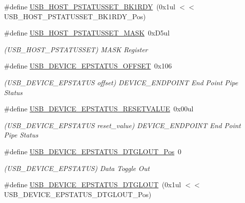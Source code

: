 \begin{DoxyCompactItemize}
\#define \mbox{\hyperlink{group___s_a_m_d21___u_s_b_gad320138f25de6218a2d39856de2d1d3f}{U\+S\+B\+\_\+\+H\+O\+S\+T\+\_\+\+P\+S\+T\+A\+T\+U\+S\+S\+E\+T\+\_\+\+B\+K1\+R\+DY}}~(0x1ul $<$$<$ U\+S\+B\+\_\+\+H\+O\+S\+T\+\_\+\+P\+S\+T\+A\+T\+U\+S\+S\+E\+T\+\_\+\+B\+K1\+R\+D\+Y\+\_\+\+Pos)
\item 
\#define \mbox{\hyperlink{group___s_a_m_d21___u_s_b_ga5d2001f603ae5a3d6e1418701d571ff9}{U\+S\+B\+\_\+\+H\+O\+S\+T\+\_\+\+P\+S\+T\+A\+T\+U\+S\+S\+E\+T\+\_\+\+M\+A\+SK}}~0x\+D5ul
\begin{DoxyCompactList}\small\item\em (U\+S\+B\+\_\+\+H\+O\+S\+T\+\_\+\+P\+S\+T\+A\+T\+U\+S\+S\+ET) M\+A\+SK Register \end{DoxyCompactList}\item 
\#define \mbox{\hyperlink{group___s_a_m_d21___u_s_b_gaae7c6b2350f9aa133a56c27d6a24a5a0}{U\+S\+B\+\_\+\+D\+E\+V\+I\+C\+E\+\_\+\+E\+P\+S\+T\+A\+T\+U\+S\+\_\+\+O\+F\+F\+S\+ET}}~0x106
\begin{DoxyCompactList}\small\item\em (U\+S\+B\+\_\+\+D\+E\+V\+I\+C\+E\+\_\+\+E\+P\+S\+T\+A\+T\+US offset) D\+E\+V\+I\+C\+E\+\_\+\+E\+N\+D\+P\+O\+I\+NT End Point Pipe Status \end{DoxyCompactList}\item 
\#define \mbox{\hyperlink{group___s_a_m_d21___u_s_b_ga0792d8e60e074eb65ec06ce41f142ecf}{U\+S\+B\+\_\+\+D\+E\+V\+I\+C\+E\+\_\+\+E\+P\+S\+T\+A\+T\+U\+S\+\_\+\+R\+E\+S\+E\+T\+V\+A\+L\+UE}}~0x00ul
\begin{DoxyCompactList}\small\item\em (U\+S\+B\+\_\+\+D\+E\+V\+I\+C\+E\+\_\+\+E\+P\+S\+T\+A\+T\+US reset\+\_\+value) D\+E\+V\+I\+C\+E\+\_\+\+E\+N\+D\+P\+O\+I\+NT End Point Pipe Status \end{DoxyCompactList}\item 
\#define \mbox{\hyperlink{group___s_a_m_d21___u_s_b_gadf49017b5ee61d4ff5ecf15f724e0cb8}{U\+S\+B\+\_\+\+D\+E\+V\+I\+C\+E\+\_\+\+E\+P\+S\+T\+A\+T\+U\+S\+\_\+\+D\+T\+G\+L\+O\+U\+T\+\_\+\+Pos}}~0
\begin{DoxyCompactList}\small\item\em (U\+S\+B\+\_\+\+D\+E\+V\+I\+C\+E\+\_\+\+E\+P\+S\+T\+A\+T\+US) Data Toggle Out \end{DoxyCompactList}\item 
\#define \mbox{\hyperlink{group___s_a_m_d21___u_s_b_ga1a8f76211c70eeae90065eb5d3207016}{U\+S\+B\+\_\+\+D\+E\+V\+I\+C\+E\+\_\+\+E\+P\+S\+T\+A\+T\+U\+S\+\_\+\+D\+T\+G\+L\+O\+UT}}~(0x1ul $<$$<$ U\+S\+B\+\_\+\+D\+E\+V\+I\+C\+E\+\_\+\+E\+P\+S\+T\+A\+T\+U\+S\+\_\+\+D\+T\+G\+L\+O\+U\+T\+\_\+\+Pos)

\end{DoxyCompactItemize}
